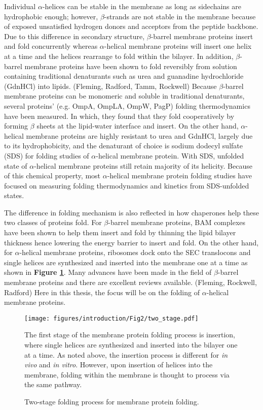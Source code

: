 Individual $\alpha$-helices can be stable in the membrane as long as sidechains are hydrophobic enough; however, $\beta$-strands are not stable in the membrane because of exposed unsatisfied hydrogen donors and acceptors from the peptide backbone. Due to this difference in secondary structure, $\beta$-barrel membrane proteins insert and fold concurrently whereas $\alpha$-helical membrane proteins will insert one helix at a time and the helices rearrange to fold within the bilayer. In addition, $\beta$-barrel membrane proteins have been shown to fold reversibly from solution containing traditional denaturants such as urea and guanadine hydrochloride (GdnHCl) into lipids. (Fleming, Radford, Tamm, Rockwell) Because $\beta$-barrel membrane proteins can be monomeric and soluble in traditional denaturants, several proteins' (e.g. OmpA, OmpLA, OmpW, PagP) folding thermodynamics have been measured. In which, they found that they fold cooperatively by forming $\beta$ sheets at the lipid-water interface and insert. On the other hand, $\alpha$-helical membrane proteins are highly resistant to urea and GdnHCl, largely due to its hydrophobicity, and the denaturant of choice is sodium dodecyl sulfate (SDS) for folding studies of $\alpha$-helical membrane protein. With SDS, unfolded state of $\alpha$-helical membrane proteins still retain majority of its helicity. Because of this chemical property, most $\alpha$-helical membrane protein folding studies have focused on measuring folding thermodynamics and kinetics from SDS-unfolded states. 

The difference in folding mechanism is also reflected in how chaperones help these two classes of proteins fold. For $\beta$-barrel membrane proteins, BAM complexes have been shown to help them insert and fold by thinning the lipid bilayer thickness hence lowering the energy barrier to insert and fold. On the other hand, for $\alpha$-helical membrane proteins, ribosomes dock onto the SEC translocons and single helices are synthesized and inserted into the membrane one at a time as shown in \textbf{Figure \ref{fig:intro_f2}}. Many advances have been made in the field of $\beta$-barrel membrane proteins and there are excellent reviews available. (Fleming, Rockwell, Radford) Here in this thesis, the focus will be on the folding of $\alpha$-helical membrane proteins.

\begin{figure}[!ht]
\begin{center}
	\texttt{[image: figures/introduction/Fig2/two\_stage.pdf]}
\end{center}
	\caption{Two-stage folding process for membrane protein folding.}
The first stage of the membrane protein folding process is insertion, where single helices are synthesized and inserted into the bilayer one at a time. As noted above, the insertion process is different for \textit{in vivo} and \textit{in vitro}. However, upon insertion of helices into the membrane, folding within the membrane is thought to process via the same pathway. 
	\label{fig:intro_f2}
\end{figure}

